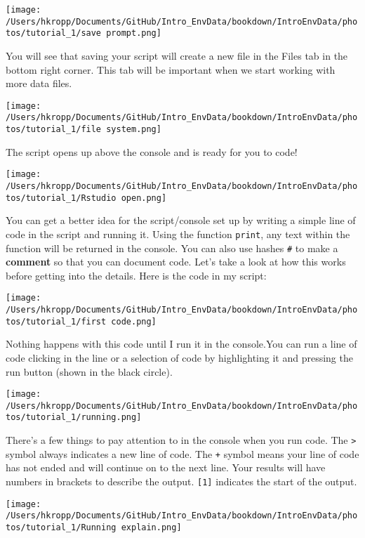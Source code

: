 \documentclass[
]{book}
\theoremstyle{definition}
\theoremstyle{definition}
\theoremstyle{definition}
\theoremstyle{definition}
\theoremstyle{remark}
\begin{document}
\texttt{[image: /Users/hkropp/Documents/GitHub/Intro\_EnvData/bookdown/IntroEnvData/photos/tutorial\_1/save prompt.png]}

You will see that saving your script will create a new file in the Files tab in the bottom right corner. This tab will be important when we start working with more data files.

\texttt{[image: /Users/hkropp/Documents/GitHub/Intro\_EnvData/bookdown/IntroEnvData/photos/tutorial\_1/file system.png]}

The script opens up above the console and is ready for you to code!

\texttt{[image: /Users/hkropp/Documents/GitHub/Intro\_EnvData/bookdown/IntroEnvData/photos/tutorial\_1/Rstudio open.png]}

You can get a better idea for the script/console set up by writing a simple line of code in the script and running it. Using the function \texttt{print}, any text within the function will be returned in the console. You can also use hashes \texttt{\#} to make a \textbf{comment} so that you can document code. Let's take a look at how this works before getting into the details. Here is the code in my script:

\texttt{[image: /Users/hkropp/Documents/GitHub/Intro\_EnvData/bookdown/IntroEnvData/photos/tutorial\_1/first code.png]}

Nothing happens with this code until I run it in the console.You can run a line of code clicking in the line or a selection of code by highlighting it and pressing the run button (shown in the black circle).

\texttt{[image: /Users/hkropp/Documents/GitHub/Intro\_EnvData/bookdown/IntroEnvData/photos/tutorial\_1/running.png]}

There's a few things to pay attention to in the console when you run code. The \texttt{\textgreater{}} symbol always indicates a new line of code. The \texttt{+} symbol means your line of code has not ended and will continue on to the next line. Your results will have numbers in brackets to describe the output. \texttt{{[}1{]}} indicates the start of the output.

\texttt{[image: /Users/hkropp/Documents/GitHub/Intro\_EnvData/bookdown/IntroEnvData/photos/tutorial\_1/Running explain.png]}
\end{document}
